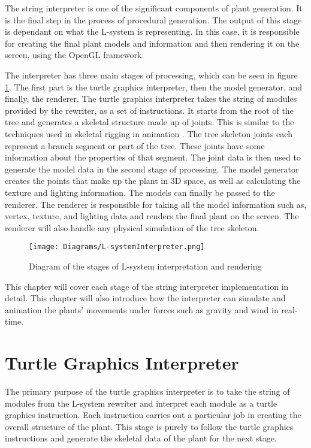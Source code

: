 
\lettrine[lines=3]{T}{}he string interpreter is one of the significant components of plant generation. It is the final step in the process of procedural generation. The output of this stage is dependant on what the L-system is representing. In this case, it is responsible for creating the final plant models and information and then rendering it on the screen, using the OpenGL framework. 

The interpreter has three main stages of processing, which can be seen in figure \ref{l-system interpreter}. The first part is the turtle graphics interpreter, then the model generator, and finally, the renderer. The turtle graphics interpreter takes the string of modules provided by the rewriter, as a set of instructions. It starts from the root of the tree and generates a skeletal structure made up of joints. This is similar to the techniques used in skeletal rigging in animation \cite{gregory2014game}. The tree skeleton joints each represent a branch segment or part of the tree. These joints have some information about the properties of that segment. The joint data is then used to generate the model data in the second stage of processing. The model generator creates the points that make up the plant in 3D space, as well as calculating the texture and lighting information. The models can finally be passed to the renderer. The renderer is responsible for taking all the model information such as, vertex, texture, and lighting data and renders the final plant on the screen. The renderer will also handle any physical simulation of the tree skeleton.

\begin{figure}[htbp]
	{\centering
		\vspace{7px}
		\texttt{[image: Diagrams/L-systemInterpreter.png]}
		\caption{Diagram of the stages of L-system interpretation and rendering} \label{l-system interpreter}
	}
\end{figure}
\FloatBarrier

\noindent
This chapter will cover each stage of the string interpreter implementation in detail. This chapter will also introduce how the interpreter can simulate and animation the plants' movements under forces such as gravity and wind in real-time. 

\section{Turtle Graphics Interpreter}

The primary purpose of the turtle graphics interpreter is to take the string of modules from the L-system rewriter and interpret each module as a turtle graphics instruction. Each instruction carries out a particular job in creating the overall structure of the plant. This stage is purely to follow the turtle graphics instructions and generate the skeletal data of the plant for the next stage.

